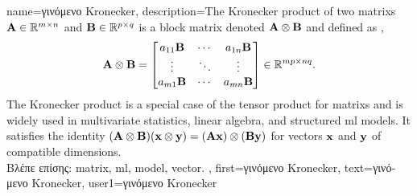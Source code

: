 {name={\foreignlanguage{greek}{γινόμενο} Kronecker}, 
	description={The Kronecker product  of two \gls{matrix}s ${\bf A} \in \mathbb{R}^{m \times n}$ 
		and ${\bf B} \in \mathbb{R}^{p \times q}$ is a block \gls{matrix} denoted ${\bf A} \otimes {\bf B}$ 
	 	and defined as \cite{GolubVanLoanBook}, \cite{HornMatAnalysis}
    		\[
      		{\bf A} \otimes {\bf B} =
      		\begin{bmatrix}
        		a_{11}{\bf B} & \cdots & a_{1n}{\bf B} \\
        		\vdots & \ddots & \vdots \\
        		a_{m1}{\bf B} & \cdots & a_{mn}{\bf B}
      		\end{bmatrix}
      		\in \mathbb{R}^{mp \times nq}.
    		\]
    		The Kronecker product is a special case of the tensor product for \gls{matrix}s and is 
		widely used in multivariate statistics, linear algebra, and structured \gls{ml} \gls{model}s. 
		It satisfies the identity $({\bf A} \otimes {\bf B})({\bf x} \otimes {\bf y}) = ({\bf A}{\bf x}) \otimes ({\bf B}{\bf y})$ 
		for \gls{vector}s ${\bf x}$ and ${\bf y}$ of compatible dimensions. \\
		\foreignlanguage{greek}{Βλέπε επίσης:} \gls{matrix}, \gls{ml}, \gls{model}, \gls{vector}. },
	first={\foreignlanguage{greek}{γινόμενο} Kronecker},
	text={\foreignlanguage{greek}{γινόμενο} Kronecker},
	user1={\foreignlanguage{greek}{γινόμενο} Kronecker} %
}

